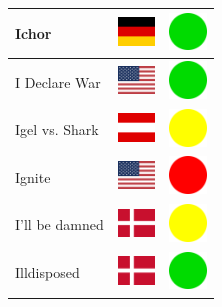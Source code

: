 \documentclass[12pt, a4paper, twoside]{report}
\begin{document}
\begin{center}
\begin{longtable}{|p{5cm}|p{2cm}|p{2cm}|}
 Ichor                                                      & \includegraphics[width=1cm]{../4x3/de} &   \includegraphics[width=1cm]{../likes/y} \\ \hline
 I Declare War                                              & \includegraphics[width=1cm]{../4x3/us} &   \includegraphics[width=1cm]{../likes/y} \\ \hline
 Igel vs. Shark                                             & \includegraphics[width=1cm]{../4x3/at} &   \includegraphics[width=1cm]{../likes/m} \\ \hline
 Ignite                                                     & \includegraphics[width=1cm]{../4x3/us} &   \includegraphics[width=1cm]{../likes/n} \\ \hline
 I'll be damned                                             & \includegraphics[width=1cm]{../4x3/dk} &   \includegraphics[width=1cm]{../likes/m} \\ \hline
 Illdisposed                                                & \includegraphics[width=1cm]{../4x3/dk} &   \includegraphics[width=1cm]{../likes/y} \\ \hline

\end{longtable}
\end{center}
\end{document}
